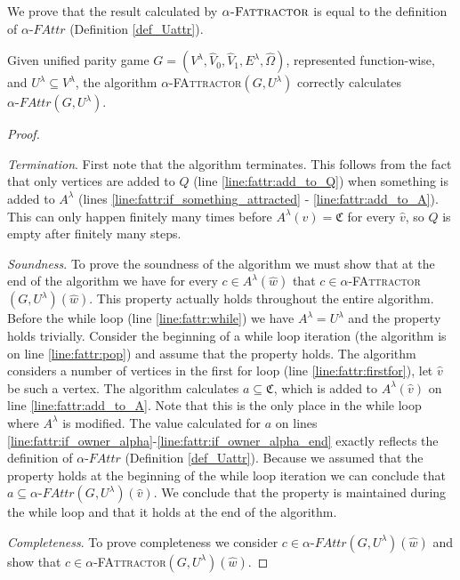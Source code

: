 We prove that the result calculated by $\alpha\textsc{-Fattractor}$ is equal to the definition of $\alpha\textit{-FAttr}$ (Definition \ref{def_Uattr}). 

\begin{theorem}
Given unified parity game $G = (V^\lambda, \hat{V}_0,\hat{V}_1,E^\lambda,\hat{\Omega})$, represented function-wise, and $U^\lambda \subseteq V^\lambda$, the algorithm $\alpha$-\textsc{FAttractor}$(G, U^\lambda)$ correctly calculates $\alpha\textit{-FAttr}(G,U^\lambda)$.
	\begin{proof}\ 
		
		\textit{Termination}. First note that the algorithm terminates. This follows from the fact that only vertices are added to $Q$ (line \ref{line:fattr:add_to_Q}) when something is added to $A^\lambda$ (lines \ref{line:fattr:if_something_attracted} - \ref{line:fattr:add_to_A}). This can only happen finitely many times before $A^\lambda(\hat{v}) = \mathfrak{C}$ for every $\hat{v}$, so $Q$ is empty after finitely many steps.
		
		\textit{Soundness}. To prove the soundness of the algorithm we must show that at the end of the algorithm we have for every $c\in A^\lambda(\hat{w})$ that $c \in \alpha$-\textsc{FAttractor}$(G, U^\lambda)(\hat{w})$. This property actually holds throughout the entire algorithm. Before the while loop (line \ref{line:fattr:while}) we have $A^\lambda = U^\lambda$ and the property holds trivially. Consider the beginning of a while loop iteration (the algorithm is on line \ref{line:fattr:pop}) and assume that the property holds. The algorithm considers a number of vertices in the first for loop (line \ref{line:fattr:firstfor}), let $\hat{v}$ be such a vertex. The algorithm calculates $a \subseteq \mathfrak{C}$, which is added to $A^\lambda(\hat{v})$ on line \ref{line:fattr:add_to_A}. Note that this is the only place in the while loop where $A^\lambda$ is modified. The value calculated for $a$ on lines \ref{line:fattr:if_owner_alpha}-\ref{line:fattr:if_owner_alpha_end} exactly reflects the definition of $\alpha\textit{-FAttr}$ (Definition \ref{def_Uattr}). Because we assumed that the property holds at the beginning of the while loop iteration we can conclude that $a \subseteq \alpha\textit{-FAttr}(G,U^\lambda)(\hat{v})$. We conclude that the property is maintained during the while loop and that it holds at the end of the algorithm.
		
		\textit{Completeness}. To prove completeness we consider $c \in \alpha\textit{-FAttr}(G,U^\lambda)(\hat{w})$ and show that $c \in \alpha$-\textsc{FAttractor}$(G, U^\lambda)(\hat{w})$.
		

\end{proof}
\end{theorem}
